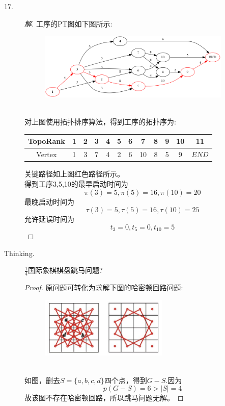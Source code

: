 \documentclass[UTF8, onecolumn, a4paper]{article}
\begin{document}
\begin{description}
\item[17.]
\begin{proof}[解]
工序的PT图如下图所示:
\begin{figure}[h]
	\centering
	\includegraphics[width=0.9\textwidth]{demo6.png}
\end{figure}
\\对上图使用拓扑排序算法，得到工序的拓扑序为:
\begin{center}
	\begin{tabular}{cccccccccccc}
		\hline
		TopoRank &1 & 2 & 3 & 4 & 5 & 6 & 7 & 8 & 9 & 10 & 11\\
		\hline
		Vertex&1& 3& 7& 4 & 2 & 6 &10 &8&5&9& $END$ \\
		\hline
	\end{tabular}
\end{center}
关键路径如上图红色路径所示。\\得到工序3,5,10的最早启动时间为$$\pi(3) = 5, \pi(5) = 16, \pi(10) = 20$$
最晚启动时间为$$\tau(3) = 5, \tau(5) = 16, \tau(10) = 25$$
允许延误时间为$$t_3 = 0, t_5 =0,t_{10}=5$$
\end{proof}

\item[Thinking.]
$\frac{1}{4}$国际象棋棋盘跳马问题?
\begin{proof}
原问题可转化为求解下图的哈密顿回路问题:
\begin{figure}[h]
	\centering
	\includegraphics[width=0.6\textwidth]{demo10.png}
\end{figure}
\\如图，删去$S=\{a,b,c,d\}$四个点，得到$G-S$.因为$$p(G-S) = 6 > |S| = 4$$故该图不存在哈密顿回路，所以跳马问题无解。
\end{proof}


\end{description}
\end{document}
